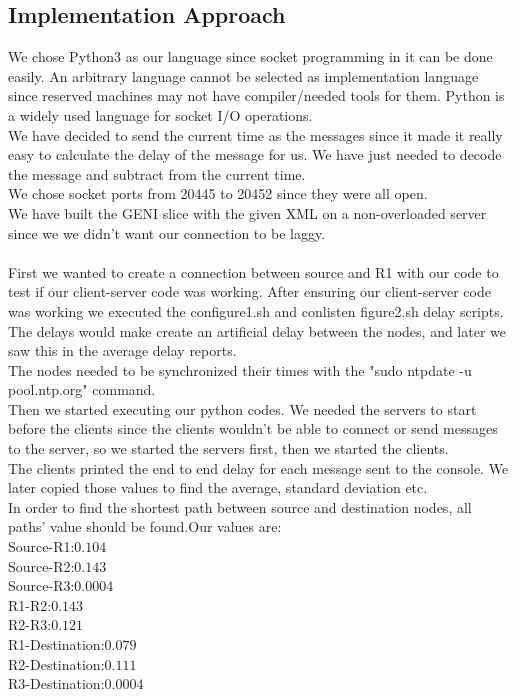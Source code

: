 \documentclass[conference]{IEEEtran}
\begin{document}
\subsection{Implementation Approach}
We chose Python3 as our language since socket programming in it can be done easily. An arbitrary language cannot be selected as implementation language since reserved machines may not have compiler/needed tools for them. Python is a widely used language for socket I/O operations.\\
We have decided to send the current time as the messages since it made it really easy to calculate the delay of the message for us. We have just needed to decode the message and subtract from the current time. \\ 
We chose socket ports from 20445 to 20452 since they were all open. \\
We have built the GENI slice with the given XML on a non-overloaded server since we we didn't want our connection to be laggy.\\
\\
First we wanted to create a connection between source and R1 with our code to test if our client-server code was working. After ensuring our client-server code was working we executed the configure1.sh and conlisten figure2.sh delay scripts. The delays would make create an artificial delay between the nodes, and later we saw this in the average delay reports. \\
The nodes needed to be synchronized their times with the "sudo ntpdate -u pool.ntp.org" command. \\
Then we started executing our python codes. We needed the servers to start before the clients since the clients wouldn't be able to connect or send messages to the server, so we started the servers first, then we started the clients. \\
The clients printed the end to end delay for each message sent to the console. We later copied those values to find the average, standard deviation etc. \\

In order to find the shortest path between source and destination nodes, all paths' value should be found.Our values are:\\
Source-R1:$0.104$\\
Source-R2:$0.143$\\
Source-R3:$0.0004$\\
R1-R2:$0.143$\\
R2-R3:$0.121$\\
R1-Destination:$0.079$\\
R2-Destination:$0.111$\\
R3-Destination:$0.0004$\\
\end{document}
